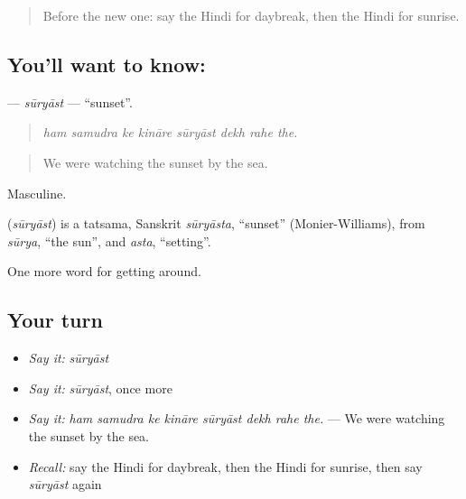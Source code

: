 \label{lesson:HI-C441-suryast}



\begin{quote}
Before the new one: say the Hindi for daybreak, then the Hindi for sunrise.
\end{quote}

\subsection*{You'll want to know: }
\textbf{} — \emph{sūryāst} — \textquotedblleft{}sunset\textquotedblright{}.

\begin{quote}
       
\end{quote}

\begin{quote}
\emph{ham samudra ke kināre sūryāst dekh rahe the.}
\end{quote}

\begin{quote}
We were watching the sunset by the sea.
\end{quote}

Masculine.

\begin{cousinweb}
\textbf{} (\emph{sūryāst}) is a tatsama, Sanskrit \emph{sūryāsta}, \textquotedblleft{}sunset\textquotedblright{} (Monier-Williams), from \emph{sūrya}, \textquotedblleft{}the sun\textquotedblright{}, and \emph{asta}, \textquotedblleft{}setting\textquotedblright{}.
\end{cousinweb}

\begin{grammarlens}[title={What you've built}]
One more word for getting around.
\end{grammarlens}

\subsection*{Your turn}
\begin{itemize}
\raggedright
  \item \emph{Say it:} \emph{sūryāst}
  \item \emph{Say it:} \emph{sūryāst}, once more
  \item \emph{Say it:} \emph{ham samudra ke kināre sūryāst dekh rahe the.} — We were watching the sunset by the sea.
  \item \emph{Recall:} say the Hindi for daybreak, then the Hindi for sunrise, then say \emph{sūryāst} again
\end{itemize}


